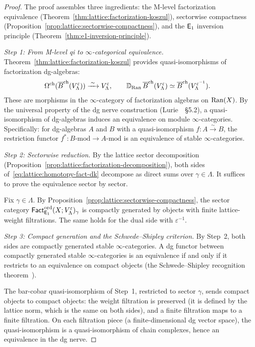 \begin{proof}
The proof assembles three ingredients: the M-level factorization
equivalence (Theorem~\ref{thm:lattice:factorization-koszul}),
sectorwise compactness
(Proposition~\ref{prop:lattice:sectorwise-compactness}), and the
$\mathsf{E}_1$ inversion principle
(Theorem~\ref{thm:e1-inversion-principle}).

\emph{Step 1: From M-level qi to $\infty$-categorical equivalence.}
Theorem~\ref{thm:lattice:factorization-koszul} provides
quasi-isomorphisms of factorization dg-algebras:
\[
\Omega^{\mathrm{ch}}(\overline{B}^{\mathrm{ch}}(V_\Lambda^\varepsilon))
\xrightarrow{\;\sim\;} V_\Lambda^\varepsilon,
\qquad
\mathbb{D}_{\operatorname{Ran}}\, \overline{B}^{\mathrm{ch}}(V_\Lambda^\varepsilon)
\simeq \overline{B}^{\mathrm{ch}}(V_\Lambda^{\varepsilon^{-1}}).
\]
These are morphisms in the $\infty$-category of factorization
algebras on $\operatorname{Ran}(X)$.  By the universal property of the dg nerve
construction (Lurie~\cite{LurieHA}~\S5.2), a quasi-isomorphism
of dg-algebras induces an equivalence on module
$\infty$-categories.  Specifically: for dg-algebras $A$ and $B$
with a quasi-isomorphism $f\colon A \xrightarrow{\sim} B$, the
restriction functor $f^*\colon B\text{-mod} \to A\text{-mod}$
is an equivalence of stable $\infty$-categories.

\emph{Step 2: Sectorwise reduction.}
By the lattice sector decomposition
(Proposition~\ref{prop:lattice:factorization-decomposition}),
both sides of~\eqref{eq:lattice:homotopy-fact-dk} decompose as
direct sums over $\gamma \in \Lambda$.  It suffices to prove the
equivalence sector by sector.

Fix $\gamma \in \Lambda$.  By
Proposition~\ref{prop:lattice:sectorwise-compactness}, the sector
category $\mathsf{Fact}_{\mathsf{E}_1}^{\mathrm{ord}}(X; V_\Lambda^\varepsilon)_\gamma$ is
compactly generated by objects with finite lattice-weight
filtrations.  The same holds for the dual side with
$\varepsilon^{-1}$.

\emph{Step 3: Compact generation and the Schwede--Shipley criterion.}
By Step~2, both sides are compactly generated stable
$\infty$-categories.  A dg functor between compactly generated
stable $\infty$-categories is an equivalence if and only if it
restricts to an equivalence on compact objects (the
Schwede--Shipley recognition theorem~\cite{SS03}).

The bar-cobar quasi-isomorphism of Step~1, restricted to sector
$\gamma$, sends compact objects to compact objects: the weight
filtration is preserved (it is defined by the lattice norm, which
is the same on both sides), and a finite filtration maps to a
finite filtration.  On each filtration piece (a finite-dimensional
dg vector space), the quasi-isomorphism is a quasi-isomorphism of
chain complexes, hence an equivalence in the dg nerve.


\end{proof}
